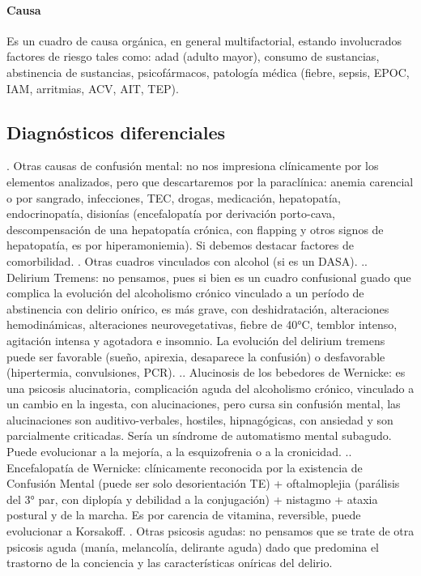 \documentclass{scrbook}
\begin{document}
\paragraph{Causa}
Es un cuadro de causa orgánica, en general multifactorial, estando involucrados factores de riesgo tales como: adad (adulto mayor), consumo de sustancias, abstinencia de sustancias, psicofármacos, patología médica (fiebre, sepsis, EPOC, IAM, arritmias, ACV, AIT, TEP).
\subsection*{Diagnósticos diferenciales}
. Otras causas de confusión mental: no nos impresiona clínicamente por los elementos analizados, pero que descartaremos por la paraclínica: anemia carencial o por sangrado, infecciones, TEC, drogas, medicación, hepatopatía, endocrinopatía, disionías (encefalopatía por derivación porto-cava, descompensación de una hepatopatía crónica, con flapping y otros signos de hepatopatía, es por hiperamoniemia). Si debemos destacar factores de comorbilidad.
. Otras cuadros vinculados con alcohol (si es un DASA).
.. Delirium Tremens: no pensamos, pues si bien es un cuadro confusional guado que complica la evolución del alcoholismo crónico vinculado a un período de abstinencia con delirio onírico, es más grave, con deshidratación, alteraciones hemodinámicas, alteraciones neurovegetativas, fiebre de 40°C, temblor intenso, agitación intensa y agotadora e insomnio. La evolución del delirium tremens puede ser favorable (sueño, apirexia, desaparece la confusión) o desfavorable (hipertermia, convulsiones, PCR).
.. Alucinosis de los bebedores de Wernicke: es una psicosis alucinatoria, complicación aguda del alcoholismo crónico, vinculado a un cambio en la ingesta, con alucinaciones, pero cursa sin confusión mental, las alucinaciones son auditivo-verbales, hostiles, hipnagógicas, con ansiedad y son parcialmente criticadas. Sería un síndrome de automatismo mental subagudo. Puede evolucionar a la mejoría, a la esquizofrenia o a la cronicidad.
.. Encefalopatía de Wernicke: clínicamente reconocida por la existencia de Confusión Mental (puede ser solo desorientación TE) + oftalmoplejia (parálisis del 3° par, con diplopía y debilidad a la conjugación) + nistagmo + ataxia postural y de la marcha. Es por carencia de vitamina, reversible, puede evolucionar a Korsakoff.
. Otras psicosis agudas: no pensamos que se trate de otra psicosis aguda (manía, melancolía, delirante aguda) dado que predomina el trastorno de la conciencia y las características oníricas del delirio.
\end{document}
